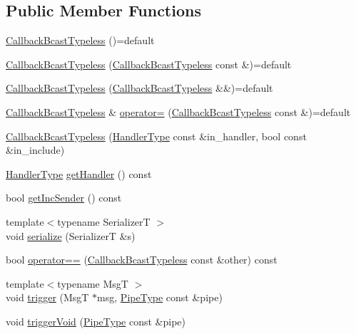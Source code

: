 \subsection*{Public Member Functions}
\begin{DoxyCompactItemize}
\item 
\hyperlink{structvt_1_1pipe_1_1callback_1_1_callback_bcast_typeless_a4f41ee712c6d8359f2702731cdb508e0}{Callback\+Bcast\+Typeless} ()=default
\item 
\hyperlink{structvt_1_1pipe_1_1callback_1_1_callback_bcast_typeless_a21bda4efe28c82f442bf0881b1148196}{Callback\+Bcast\+Typeless} (\hyperlink{structvt_1_1pipe_1_1callback_1_1_callback_bcast_typeless}{Callback\+Bcast\+Typeless} const \&)=default
\item 
\hyperlink{structvt_1_1pipe_1_1callback_1_1_callback_bcast_typeless_a47d8224353671c6a7769abaed3a032ed}{Callback\+Bcast\+Typeless} (\hyperlink{structvt_1_1pipe_1_1callback_1_1_callback_bcast_typeless}{Callback\+Bcast\+Typeless} \&\&)=default
\item 
\hyperlink{structvt_1_1pipe_1_1callback_1_1_callback_bcast_typeless}{Callback\+Bcast\+Typeless} \& \hyperlink{structvt_1_1pipe_1_1callback_1_1_callback_bcast_typeless_acad87bb1887561979d41c298896463e3}{operator=} (\hyperlink{structvt_1_1pipe_1_1callback_1_1_callback_bcast_typeless}{Callback\+Bcast\+Typeless} const \&)=default
\item 
\hyperlink{structvt_1_1pipe_1_1callback_1_1_callback_bcast_typeless_a2303983c8ae3dacbb2f1ade336a1c1e8}{Callback\+Bcast\+Typeless} (\hyperlink{namespacevt_af64846b57dfcaf104da3ef6967917573}{Handler\+Type} const \&in\+\_\+handler, bool const \&in\+\_\+include)
\item 
\hyperlink{namespacevt_af64846b57dfcaf104da3ef6967917573}{Handler\+Type} \hyperlink{structvt_1_1pipe_1_1callback_1_1_callback_bcast_typeless_a15f773a711d9771b8c60683de2762bc8}{get\+Handler} () const
\item 
bool \hyperlink{structvt_1_1pipe_1_1callback_1_1_callback_bcast_typeless_a3a93cb6e0ac25c14edfece0d19feff23}{get\+Inc\+Sender} () const
\item 
{\footnotesize template$<$typename SerializerT $>$ }\\void \hyperlink{structvt_1_1pipe_1_1callback_1_1_callback_bcast_typeless_ad8a8822a82d979df798f8dcb57c8c4e6}{serialize} (SerializerT \&s)
\item 
bool \hyperlink{structvt_1_1pipe_1_1callback_1_1_callback_bcast_typeless_a38b71fafbb0f2e6ce000eaa5faec463c}{operator==} (\hyperlink{structvt_1_1pipe_1_1callback_1_1_callback_bcast_typeless}{Callback\+Bcast\+Typeless} const \&other) const
\item 
{\footnotesize template$<$typename MsgT $>$ }\\void \hyperlink{structvt_1_1pipe_1_1callback_1_1_callback_bcast_typeless_a6a23e27691ce2e3789e5a5dc1a88ae0f}{trigger} (MsgT $\ast$msg, \hyperlink{namespacevt_ac9852acda74d1896f48f406cd72c7bd3}{Pipe\+Type} const \&pipe)
\item 
void \hyperlink{structvt_1_1pipe_1_1callback_1_1_callback_bcast_typeless_a4f46128a5ef56035c6e2874b5387907d}{trigger\+Void} (\hyperlink{namespacevt_ac9852acda74d1896f48f406cd72c7bd3}{Pipe\+Type} const \&pipe)
\end{DoxyCompactItemize}
